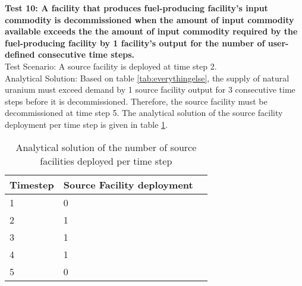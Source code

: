 \documentclass[11pt,letterpaper]{article}
\begin{document}
\noindent
\textbf{Test 10: A facility that produces fuel-producing facility's input commodity is decommissioned when the amount of input commodity available exceeds the the amount of input commodity required by the fuel-producing facility by 1 facility's output for the number of user-defined consecutive time steps.} \\
Test Scenario: A source facility is deployed at time step 2. \\
Analytical Solution: Based on table \ref{tab:everythingelse}, the supply of natural uranium must exceed demand by 1 source facility output for 3 consecutive time steps before it is decommissioned. Therefore, the source facility must be decommissioned at time step 5. The analytical solution of the source facility deployment per time step is given in table \ref{tab:test-supplymoredemand2}. 

\begin{table}[H]
     \centering
    \begin{tabularx}{\textwidth}{bbb}
       \hline
       Timestep & Source Facility deployment \\
       \hline
       1 & 0 \\
       2 & 1 \\
       3 & 1 \\
       4 & 1 \\
       5 & 0 \\
       \hline
    \end{tabularx}
    \caption {Analytical solution of the number of source facilities deployed per time step}
    \label{tab:test-supplymoredemand2}
\end{table}
\end{document}

